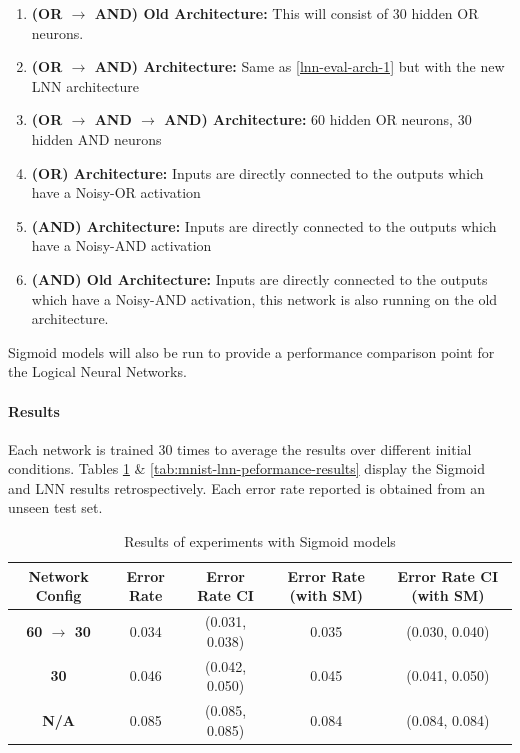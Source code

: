 \begin{enumerate}
	\item \textbf{(OR $\rightarrow$ AND) Old Architecture:} This will consist of 30 hidden OR neurons. \label{lnn-eval-arch-1}
	\item \textbf{(OR $\rightarrow$ AND) Architecture:} Same as \ref{lnn-eval-arch-1} but with the new LNN architecture \label{lnn-eval-arch-2}
	\item \textbf{(OR $\rightarrow$ AND $\rightarrow$ AND) Architecture: } 60 hidden OR neurons, 30 hidden AND neurons\label{lnn-eval-arch-4}
	\item \textbf{(OR) Architecture:} Inputs are directly connected to the outputs which have a Noisy-OR activation \label{lnn-eval-arch-5}
	\item \textbf{(AND) Architecture:} Inputs are directly connected to the outputs which have a Noisy-AND activation\label{lnn-eval-arch-6}
	\item \textbf{(AND) Old Architecture:} Inputs are directly connected to the outputs which have a Noisy-AND activation, this network is also running on the old architecture.\label{lnn-eval-arch-7}
\end{enumerate}

Sigmoid models will also be run to provide a performance comparison point for the Logical Neural Networks.

\paragraph{Results}
Each network is trained 30 times to average the results over different initial conditions. Tables \ref{tab:mnist-sigmoid-peformance-results} \& \ref{tab:mnist-lnn-peformance-results} display the Sigmoid and LNN results retrospectively. Each error rate reported is obtained from an unseen test set.

\begin{table}[H]
	\begin{center}
		\begin{tabular}{| c | c | c | c | c |}
			\hline
			\textbf{Network Config} & \textbf{Error Rate} & \textbf{Error Rate CI} & \textbf{Error Rate (with SM)} & \textbf{Error Rate CI (with SM)}\\
			\hline
			\hline
			\textbf{60 $\rightarrow$ 30} & 0.034 & (0.031, 0.038) & 0.035 & (0.030, 0.040)\\
			\textbf{30} & 0.046 & (0.042, 0.050) & 0.045 & (0.041, 0.050)\\
			\textbf{N/A} & 0.085 & (0.085, 0.085) & 0.084 & (0.084, 0.084)\\
			\hline
		\end{tabular}
	\end{center}
	\caption{Results of experiments with Sigmoid models}
	\label{tab:mnist-sigmoid-peformance-results}
\end{table}

